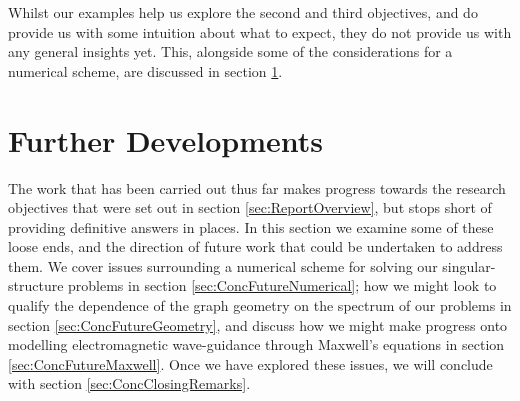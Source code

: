 Whilst our examples help us explore the second and third objectives, and do provide us with some intuition about what to expect, they do not provide us with any general insights yet.
This, alongside some of the considerations for a numerical scheme, are discussed in section \ref{sec:ConcFuture}.

\section{Further Developments} \label{sec:ConcFuture}
The work that has been carried out thus far makes progress towards the research objectives that were set out in section \ref{sec:ReportOverview}, but stops short of providing definitive answers in places.
In this section we examine some of these loose ends, and the direction of future work that could be undertaken to address them.
We cover issues surrounding a numerical scheme for solving our singular-structure problems in section \ref{sec:ConcFutureNumerical}; how we might look to qualify the dependence of the graph geometry on the spectrum of our problems in section \ref{sec:ConcFutureGeometry}, and discuss how we might make progress onto modelling electromagnetic wave-guidance through Maxwell's equations in section \ref{sec:ConcFutureMaxwell}.
Once we have explored these issues, we will conclude with section \ref{sec:ConcClosingRemarks}.

